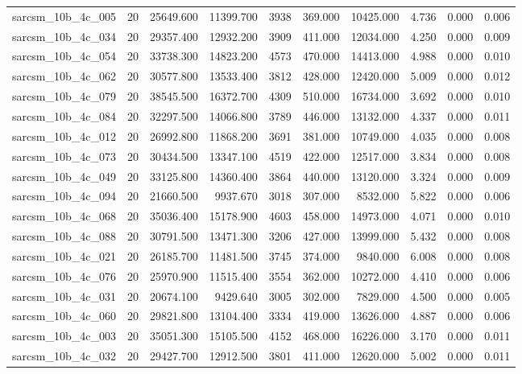\begin{tabular}{lrrrrrrrrr}
sarcsm\_10b\_4c\_005 & 20 & 25649.600 & 11399.700 & 3938 & 369.000 & 10425.000 & 4.736 & 0.000 & 0.006 \\
sarcsm\_10b\_4c\_034 & 20 & 29357.400 & 12932.200 & 3909 & 411.000 & 12034.000 & 4.250 & 0.000 & 0.009 \\
sarcsm\_10b\_4c\_054 & 20 & 33738.300 & 14823.200 & 4573 & 470.000 & 14413.000 & 4.988 & 0.000 & 0.010 \\
sarcsm\_10b\_4c\_062 & 20 & 30577.800 & 13533.400 & 3812 & 428.000 & 12420.000 & 5.009 & 0.000 & 0.012 \\
sarcsm\_10b\_4c\_079 & 20 & 38545.500 & 16372.700 & 4309 & 510.000 & 16734.000 & 3.692 & 0.000 & 0.010 \\
sarcsm\_10b\_4c\_084 & 20 & 32297.500 & 14066.800 & 3789 & 446.000 & 13132.000 & 4.337 & 0.000 & 0.011 \\
sarcsm\_10b\_4c\_012 & 20 & 26992.800 & 11868.200 & 3691 & 381.000 & 10749.000 & 4.035 & 0.000 & 0.008 \\
sarcsm\_10b\_4c\_073 & 20 & 30434.500 & 13347.100 & 4519 & 422.000 & 12517.000 & 3.834 & 0.000 & 0.008 \\
sarcsm\_10b\_4c\_049 & 20 & 33125.800 & 14360.400 & 3864 & 440.000 & 13120.000 & 3.324 & 0.000 & 0.009 \\
sarcsm\_10b\_4c\_094 & 20 & 21660.500 & 9937.670 & 3018 & 307.000 & 8532.000 & 5.822 & 0.000 & 0.006 \\
sarcsm\_10b\_4c\_068 & 20 & 35036.400 & 15178.900 & 4603 & 458.000 & 14973.000 & 4.071 & 0.000 & 0.010 \\
sarcsm\_10b\_4c\_088 & 20 & 30791.500 & 13471.300 & 3206 & 427.000 & 13999.000 & 5.432 & 0.000 & 0.008 \\
sarcsm\_10b\_4c\_021 & 20 & 26185.700 & 11481.500 & 3745 & 374.000 & 9840.000 & 6.008 & 0.000 & 0.008 \\
sarcsm\_10b\_4c\_076 & 20 & 25970.900 & 11515.400 & 3554 & 362.000 & 10272.000 & 4.410 & 0.000 & 0.006 \\
sarcsm\_10b\_4c\_031 & 20 & 20674.100 & 9429.640 & 3005 & 302.000 & 7829.000 & 4.500 & 0.000 & 0.005 \\
sarcsm\_10b\_4c\_060 & 20 & 29821.800 & 13104.400 & 3334 & 419.000 & 13626.000 & 4.887 & 0.000 & 0.006 \\
sarcsm\_10b\_4c\_003 & 20 & 35051.300 & 15105.500 & 4152 & 468.000 & 16226.000 & 3.170 & 0.000 & 0.011 \\
sarcsm\_10b\_4c\_032 & 20 & 29427.700 & 12912.500 & 3801 & 411.000 & 12620.000 & 5.002 & 0.000 & 0.011 \\

\end{tabular}
